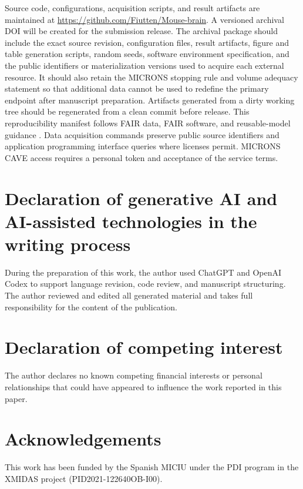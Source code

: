 \documentclass[a4paper,fleqn]{cas-sc}
\begin{document}
Source code, configurations, acquisition scripts, and result artifacts are
maintained at \url{https://github.com/Fiutten/Mouse-brain}. A versioned archival
DOI will be created for the submission release. The archival package should
include the exact source revision, configuration files, result artifacts, figure
and table generation scripts, random seeds, software environment specification,
and the public identifiers or materialization versions used to acquire each
external resource. It should also retain the MICRONS stopping rule and volume
adequacy statement so that additional data cannot be used to redefine the
primary endpoint after manuscript preparation. Artifacts generated from a dirty
working tree should be regenerated from a clean commit before release. This
reproducibility manifest follows FAIR data, FAIR
software, and reusable-model guidance \citep{wilkinson2016fair,barker2022fair4rs,patel2023fairbiors,sauro2026cure}. Data acquisition commands preserve public source identifiers
and application programming interface queries where licenses permit. MICRONS
CAVE access requires a personal token and acceptance of the service terms.


\section{Declaration of generative AI and AI-assisted technologies in the writing process}
\label{sec:generative-ai-declaration}
During the preparation of this work, the author used ChatGPT and OpenAI Codex to support language revision, code review, and manuscript structuring. The author reviewed and edited all generated material and takes full responsibility for the content of the publication.

\section{Declaration of competing interest}
\label{sec:competing-interest}
The author declares no known competing financial interests or personal
relationships that could have appeared to influence the work reported in this
paper.

\section{Acknowledgements}
\label{sec:acknowledgements}
This work has been funded by the Spanish MICIU under the PDI program in the
XMIDAS project (PID2021-122640OB-I00).

\printcredits


\end{document}
